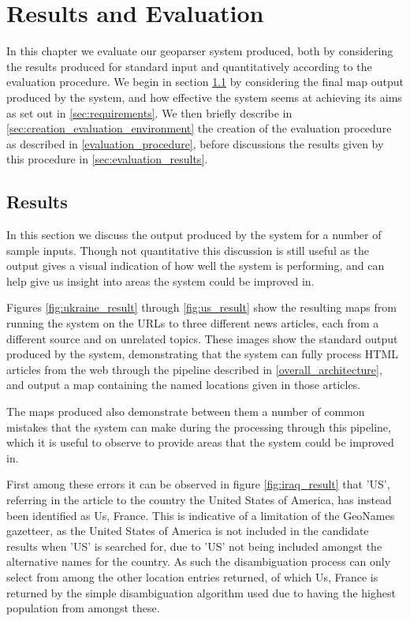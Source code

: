 \documentclass[12pt, a4paper]{report}
\begin{document}
\chapter{Results and Evaluation}
\label{chap:results}

In this chapter we evaluate our geoparser system produced, both by considering the results produced for standard input and quantitatively according to the evaluation procedure. We begin in section \ref{sec:results} by considering the final map output produced by the system, and how effective the system seems at achieving its aims as set out in \ref{sec:requirements}. We then briefly describe in \ref{sec:creation_evaluation_environment} the creation of the evaluation procedure as described in \ref{evaluation_procedure}, before discussions the results given by this procedure in \ref{sec:evaluation_results}.

\section{Results}
\label{sec:results}

In this section we discuss the output produced by the system for a number of sample inputs. Though not quantitative this discussion is still useful as the output gives a visual indication of how well the system is performing, and can help give us insight into areas the system could be improved in.

Figures \ref{fig:ukraine_result} through \ref{fig:us_result} show the resulting maps from running the system on the URLs to three different news articles, each from a different source and on unrelated topics. These images show the standard output produced by the system, demonstrating that the system can fully process HTML articles from the web through the pipeline described in \ref{overall_architecture}, and output a map containing the named locations given in those articles.

The maps produced also demonstrate between them a number of common mistakes that the system can make during the processing through this pipeline, which it is useful to observe to provide areas that the system could be improved in.

First among these errors it can be observed in figure \ref{fig:iraq_result} that 'US', referring in the article to the country the United States of America, has instead been identified as Us, France. This is indicative of a limitation of the GeoNames gazetteer, as the United States of America is not included in the candidate results when 'US' is searched for, due to 'US' not being included amongst the alternative names for the country. As such the disambiguation process can only select from among the other location entries returned, of which Us, France is returned by the simple disambiguation algorithm used due to having the highest population from amongst these.
\end{document}
